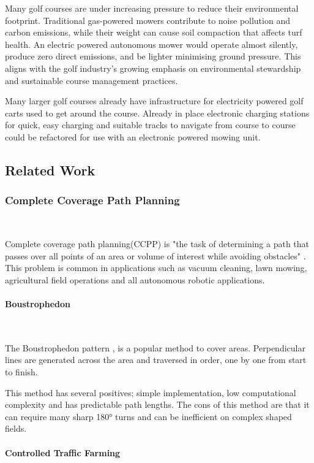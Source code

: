 \documentclass[final]{cmpreport_02}
\begin{document}
Many golf courses are under increasing pressure to reduce their environmental footprint. Traditional gas-powered mowers contribute to noise pollution and carbon emissions, while their weight can cause soil compaction that affects turf health.
An electric powered autonomous mower would operate almost silently, produce zero direct emissions, and be lighter minimising ground pressure. This aligns with the golf industry's growing emphasis on environmental stewardship and sustainable course management practices.

Many larger golf courses already have infrastructure for electricity powered golf carts used to get around the course.
Already in place electronic charging stations for quick, easy charging and suitable tracks to navigate from course to course could be refactored for use with an electronic powered mowing unit.

\subsection{Related Work}
\subsubsection{Complete Coverage Path Planning} \

Complete coverage path planning(CCPP) is "the task of determining a path that passes over all points of an area or volume of interest while avoiding obstacles" \citep{zhao2023complete}.
This problem is common in applications such as vacuum cleaning, lawn mowing, agricultural field operations and all autonomous robotic applications.

\paragraph{Boustrophedon} \

The Boustrophedon pattern \citep{boustrophedon}, is a popular method to cover areas.
Perpendicular lines are generated across the area and traversed in order, one by one from start to finish.

This method has several positives; simple implementation, low computational complexity and has predictable path lengths.
The cons of this method are that it can require many sharp 180° turns and can be inefficient on complex shaped fields.

\paragraph{Controlled Traffic Farming} \
\end{document}
